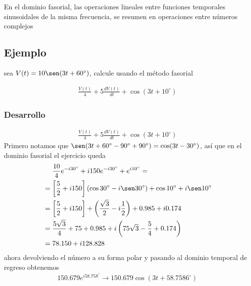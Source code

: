\documentclass[12pt]{article}
\begin{document}
En el dominio fasorial, las operaciones lineales entre funciones temporales sinusoidales de la misma frecuencia, se resumen en operaciones entre números complejos

\subsection*{Ejemplo}

sea \(V(t) = 10 \sen(3t+ 60^{\circ})\), calcule usando el método fasorial

\begin{align*}
    \frac{V(t)}{4} + 5 \frac{dV(t)}{dt} + \cos(3t + 10^{\circ})
\end{align*}
\subsubsection*{Desarrollo}
\begin{align*}
    \frac{V(t)}{4} + 5 \frac{dV(t)}{dt} + \cos(3t + 10^{\circ})
\end{align*}
Primero notamos que \(\sen(3t + 60^{\circ}-90^{\circ} + 90^{\circ} ) = \cos(3t -30^{\circ}) \), así que en el dominio fasorial el ejercicio queda
\begin{align*}
    & \ \quad\frac{10 }{4} e^{-i 30^{\circ}} + i 150 e^{-i30^{\circ}} + e^{i10^{\circ}} = \\
    &= \left[ \frac{5}{2} + i 150\right](\cos 30^{\circ} - i \sen 30^{\circ}) + \cos 10^{\circ} + i \sen 10 ^{\circ} \\
    &= \left[ \frac{5}{2} + i 150\right] +  \left(\frac{\sqrt{3}}{2} - i \frac{1}{2}\right) + 0.985 + i 0.174 \\
    &= \frac{5\sqrt{3}}{4} + 75 + 0.985 + i \left( 75\sqrt{3} - \frac{5}{4} +  0.174\right)  \\
    &= 78.150 + i 128.828
\end{align*} 
ahora devolviendo el número a su forma polar y pasando al dominio temporal de regreso obtenemos
\begin{align*}
   150.679 e^{i58.758^{\circ}} \rightarrow 150.679 \cos(3t + 58.7586^{\circ})
\end{align*}
\end{document}

